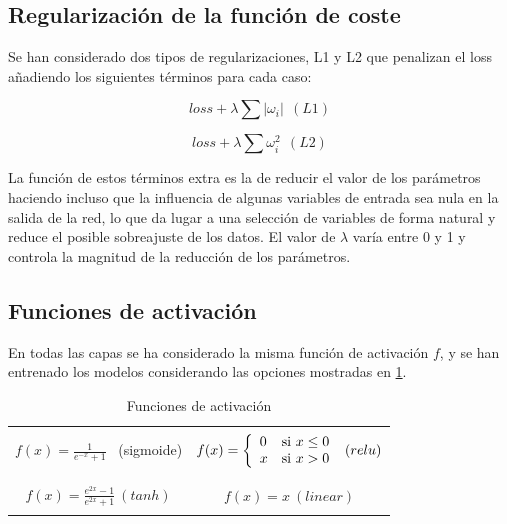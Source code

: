 



\subsection{Regularización de la función de coste}
Se han considerado dos tipos de regularizaciones, L1 y L2 que penalizan el loss añadiendo
los siguientes términos para cada caso:

\begin{equation}
    loss + \lambda \sum |\omega_i| ~~(L1)
\end{equation}

\begin{equation}
    loss + \lambda \sum \omega^2_i ~~(L2)
\end{equation}

La función de estos términos extra es la de reducir el valor de los parámetros haciendo incluso que la influencia de 
algunas variables de entrada sea nula en la salida de la red, lo que da lugar a una selección de variables de forma natural y
reduce el posible sobreajuste de los datos. El valor de $\lambda$ varía entre 0 y 1 y controla la magnitud
de la reducción de los parámetros. 


\subsection{Funciones de activación}
En todas las capas se ha considerado la misma función de activación $f$, y se han entrenado los modelos considerando 
las opciones mostradas en \ref{activation}.

\begin{table}[h!]
    \centering
    \begin{tabular}{|c|c|}   
        \hline
        &\\
     $ f(x)= \frac{1}{e^{-x}+1}$ ~(sigmoide) & 
     $f(x) = \left\lbrace
     \begin{array}{ll}
     0 &\textup{si } x\leq 0 \\
     x & \textup{si } x > 0 
     \end{array}
     \right. ~(relu)$    \\
     &\\
     \hline
     &\\
     $f(x)= \frac{e^{2x}-1}{e^{2x}+1} ~(tanh)$ & $f(x)=x ~ (linear)$    \\ 
     &\\
     \hline
    \end{tabular}
    \caption{ Funciones de activación}
    \label{activation}
    \end{table}


